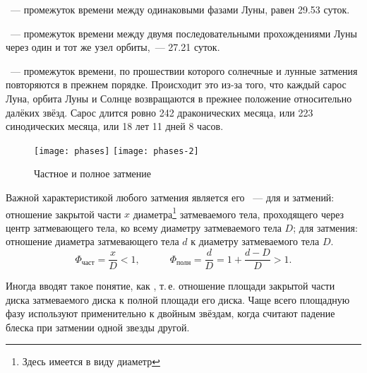 ~--- промежуток времени между одинаковыми фазами Луны, равен 29.53 суток.

~--- промежуток времени между двумя последовательными прохождениями Луны через один и тот же узел орбиты,~--- 27.21 суток.

~--- промежуток  времени, по прошествии которого солнечные и лунные затмения повторяются в прежнем порядке. Происходит это из-за того, что каждый сарос Луна, орбита Луны и Солнце возвращаются в прежнее положение относительно далёких звёзд. Сарос длится ровно 242 драконических месяца, или 223 синодических месяца, или 18 лет 11 дней 8 часов.

\begin{wrapfigure}[8]{r}{.42\tw}
	\centering
	\vspace{-1pc}
	\texttt{[image: phases]}
	\hfill
	\texttt{[image: phases-2]}
	\caption{Частное и полное затмение}
	\label{fig:part-eclipses-scheme}
\end{wrapfigure}
Важной характеристикой любого затмения является его ~--- для  и  затмений: отношение закрытой части $x$ диаметра\footnote{Здесь имеется в виду  диаметр} затмеваемого тела, проходящего через центр затмевающего тела, ко всему диаметру затмеваемого тела $D$; для  затмения: отношение диаметра затмевающего тела $d$  к диаметру затмеваемого тела $D$.
\begin{equation}
\Phi_{\text{част}} = \frac{x}{D} < 1, \quad \quad \quad \Phi_{\text{полн}} = \frac{d}{D} = 1 + \frac{d-D}{D} > 1.
\end{equation}

Иногда вводят такое понятие, как , т.\,е. отношение площади закрытой части диска затмеваемого диска к полной площади его диска. Чаще всего  площадную фазу используют применительно к двойным звёздам, когда считают падение блеска при затмении одной звезды другой.
